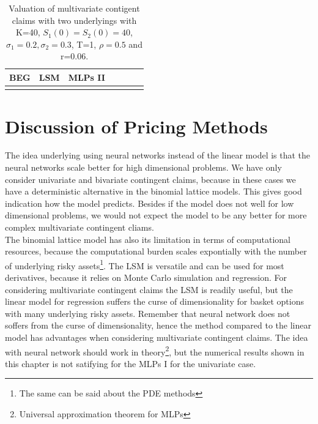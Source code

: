 \begin{table}[th]
\caption{Valuation of multivariate contigent claims with two underlyings with K=40, $S_1(0)=S_2(0)=40$, $\sigma_1=0.2, \sigma_2=0.3$, T=1, $\rho=0.5$  and r=0.06.}
\label{tab:PriceAmericanPut}
\centering
\begin{tabular}{l l l l l l l }
\toprule
\textbf{BEG} & \textbf{LSM} & \textbf{MLPs II} \\
\midrule
\bottomrule\\
\end{tabular}
\end{table}

\section{Discussion of Pricing Methods}
The idea underlying using neural networks instead of the linear model is that the neural networks scale better for high dimensional problems. We have only consider univariate and bivariate contingent claims, because in these cases we have a deterministic alternative in the binomial lattice models. This gives good indication how the model predicts. Besides if the model does not well for low dimensional problems, we would not expect the model to be any better for more complex multivariate contingent cliams.\\

The binomial lattice model has also its limitation in terms of computational resources, because the computational burden scales expontially with the number of underlying risky assets\footnote{The same can be said about the PDE methods}. The LSM is versatile and can be used for most derivatives, because it relies on Monte Carlo simulation and regression. For considering multivariate contingent claims the LSM is readily useful, but the linear model for regression suffers the curse of dimensionality for basket options with many underlying risky assets. Remember that neural network does not soffers from the curse of dimensionality, hence the method compared to the linear model has advantages when considering multivariate contingent claims. The idea with neural network should work in theory\footnote{Universal approximation theorem for MLPs}, but the numerical results shown in this chapter is not satifying for the MLPs I for the univariate case.\\

